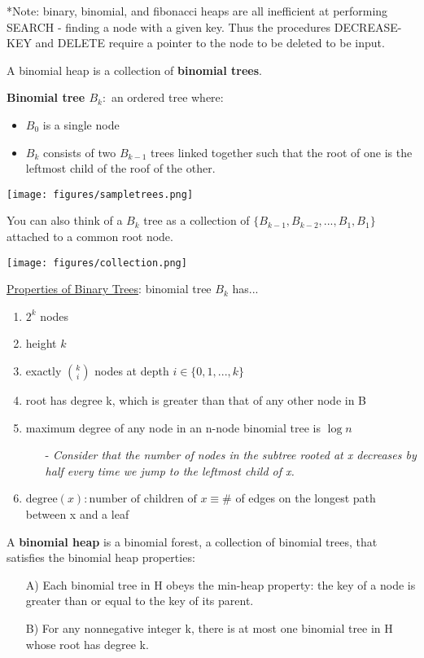 \documentclass[12pt]{article}
\begin{document}
*Note: binary, binomial, and fibonacci heaps are all inefficient at performing SEARCH - finding a node with a given key. Thus the procedures DECREASE-KEY and DELETE require a pointer to the node to be deleted to be input.

A binomial heap is a collection of \textbf{binomial trees}.

\textbf{Binomial tree $B_k :$} an ordered tree where:
	\begin{itemize}
	\item $B_0$ is a single node
	\item $B_k$ consists of two $B_{k-1}$ trees linked together such that the root of one is the leftmost child of the roof of the other.
	\end{itemize}
	
\begin{center}
\texttt{[image: figures/sampletrees.png]}
\vspace{0.5cm}

You can also think of a $B_k$ tree as a collection of $\{B_{k-1}, B_{k-2}, ... , B_1, B_1\}$ attached to a common root node.

\texttt{[image: figures/collection.png]}
\end{center}
\underline{Properties of Binary Trees}: binomial tree $B_k$ has...
	\begin{enumerate}
	\item $2^k$ nodes
	\item height $k$
	\item exactly $\binom{k}{i}$ nodes at depth $i \in \{0,1,...,k\}$
	\item root has degree k, which is greater than that of any other node in B
	\item maximum degree of any node in an n-node binomial tree is $\log{n}$
		\begin{itemize}
		\item [-]\emph{Consider that the number of nodes in the subtree rooted at x decreases by half every time we jump to the leftmost child of x.}
		\end{itemize}
	\item $\text{degree}(x) : \text{number of children of } x \equiv \#$ of edges on the longest path between x and a leaf

	\end{enumerate}
\vspace{0.5cm}


A \textbf{binomial heap} is a binomial forest, a collection of binomial trees, that satisfies the binomial heap properties:
	\begin{itemize}
	\item [A)]Each binomial tree in H obeys the min-heap property: the key of a node is greater than or equal to the key of its parent.
	\item [B)]For any nonnegative integer k, there is at most one binomial tree in H whose root has degree k.
	\end{itemize}
\end{document}
